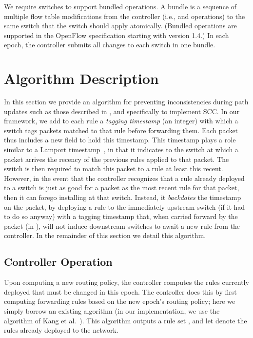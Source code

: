 We require switches to support bundled operations.  A bundle is a
sequence of multiple flow table modifications from the controller
(i.e., \switchID{}{\flowAdd} and \switchID{}{\flowDel} operations) to
the same switch that the switch should apply atomically.  (Bundled
operations are supported in the OpenFlow specification starting with
version 1.4.) In each epoch, the controller
submits all changes to each switch in one bundle.



\section{Algorithm Description}
\label{sec:algo}

In this section we provide an algorithm for preventing inconsistencies
during path updates such as those described in ,
and specifically to implement SCC.  In our framework, we add to each
rule a \textit{tagging timestamp}  (an integer)
with which a switch tags packets matched to that rule before
forwarding them.  Each packet thus includes a new field
\pktID{}{\pktTmpField} to hold this timestamp.  This timestamp plays a
role similar to a Lamport timestamp~\cite{LamportClock}, in that it
indicates to the switch at which a packet arrives the recency of the
previous rules applied to that packet.  The switch is then required to
match this packet to a rule at least this recent.  However, in the
event that the controller recognizes that a rule already deployed to a
switch is just as good for a packet \pktID{} as the most recent rule
 for that packet, then it can forego installing  at
that switch.  Instead, it \textit{backdates} the timestamp on the
packet, by deploying a rule  to the immediately
upstream switch (if it had to do so anyway) with a tagging timestamp
 that, when carried forward by the
packet (in \pktID{}{\pktTmpField}), will not induce downstream
switches to await a new rule from the controller.  In the remainder of
this section we detail this algorithm.

\subsection{Controller Operation}
\label{sec:algo:controller}

Upon computing a new routing policy, the controller computes the rules
currently deployed that must be changed in this epoch.  The controller
does this by first computing forwarding rules based on the new epoch's
routing policy; here we simply borrow an existing algorithm (in our
implementation, we use the algorithm of Kang et
al.~\cite{OneBigSwitch}).  This algorithm outputs a rule set
\newRules, and let \oldRules denote the rules already deployed to the
network.


